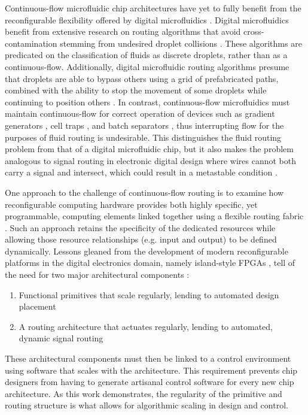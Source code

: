 Continuous-flow microfluidic chip architectures have yet to fully benefit from the reconfigurable flexibility offered by digital microfluidics \cite{fair2007digital}. Digital microfluidics benefit from extensive research on routing algorithms \cite{curtis2015simulation} that avoid cross-contamination stemming from undesired droplet collisions \cite{cho2008droplet}. These algorithms are predicated on the classification of fluids as discrete droplets, rather than as a continuous-flow. Additionally, digital microfluidic routing algorithms presume that droplets are able to bypass others using a grid of prefabricated paths, combined with the ability to stop the movement of some droplets while continuing to position others \cite{zhao2012droplet}. In contrast, continuous-flow microfluidics must maintain continuous-flow for correct operation of devices such as gradient generators \cite{hung2005continuous}, cell traps \cite{el2006cells}, and batch separators \cite{pamme2007continuous}, thus interrupting flow for the purposes of fluid routing is undesirable. This distinguishes the fluid routing problem from that of a digital microfluidic chip, but it also makes the problem analogous to signal routing in electronic digital design where wires cannot both carry a signal and intersect, which could result in a metastable condition \cite{kleeman1987metastable}.

One approach to the challenge of continuous-flow routing is to examine how reconfigurable computing hardware \cite{todman2005reconfigurable} provides both highly specific, yet programmable, computing elements linked together using a flexible routing fabric \cite{compton2002reconfigurable}. Such an approach retains the specificity of the dedicated resources while allowing those resource relationships (e.g. input and output) to be defined dynamically. Lessons gleaned from the development of modern reconfigurable platforms in the digital electronics domain, namely island-style FPGAs \cite{schmit2005extra}, tell of the need for two major architectural components \cite{kuon2008}:
\begin{enumerate}
	\item Functional primitives that scale regularly, lending to automated design placement
	\item A routing architecture that actuates regularly, lending to automated, dynamic signal routing
\end{enumerate}

These architectural components must then be linked to a control environment using software that scales with the architecture. This requirement prevents chip designers from having to generate artisanal control software for every new chip architecture. As this work demonstrates, the regularity of the primitive and routing structure is what allows for algorithmic scaling in design and control. 

